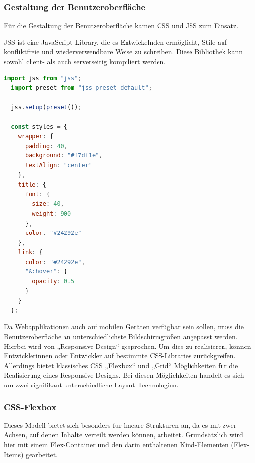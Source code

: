 \subsubsection{Gestaltung der Benutzeroberfläche}

Für die Gestaltung der Benutzeroberfläche kamen CSS und JSS zum Einsatz.

JSS ist eine JavaScript-Library, die es Entwickelnden ermöglicht, Stile auf konfliktfreie und wiederverwendbare Weise zu schreiben. Diese Bibliothek kann sowohl client- als auch serverseitig kompiliert werden. 
\cite{jss}

\begin{lstlisting}[language=JavaScript, caption=Beispiel Source-Code für die Verwendung von JSS, label=lst:impl:bspJSS]
  import jss from "jss";
  import preset from "jss-preset-default";
  
  jss.setup(preset());
  
  const styles = {
    wrapper: {
      padding: 40,
      background: "#f7df1e",
      textAlign: "center"
    },
    title: {
      font: {
        size: 40,
        weight: 900
      },
      color: "#24292e"
    },
    link: {
      color: "#24292e",
      "&:hover": {
        opacity: 0.5
      }
    }
  };
\end{lstlisting} \cite{jssExample}

Da Webapplikationen auch auf mobilen Geräten verfügbar sein sollen, muss die Benutzeroberfläche an unterschiedlichste Bildschirmgrößen angepasst werden. Hierbei wird von „Responsive Design“ gesprochen. Um dies zu realisieren, können Entwicklerinnen oder Entwickler auf bestimmte CSS-Libraries zurückgreifen. Allerdings bietet klassisches CSS „Flexbox“ und „Grid“ Möglichkeiten für die Realisierung eines Responsive Designs. Bei diesen Möglichkeiten handelt es sich um zwei signifikant unterschiedliche Layout-Technologien.
 \newpage

\subsubsection{CSS-Flexbox}

Dieses Modell bietet sich besonders für lineare Strukturen an, da es mit zwei Achsen, auf denen Inhalte verteilt werden können, arbeitet. Grundsätzlich wird hier mit einem Flex-Container und den darin enthaltenen Kind-Elementen (Flex-Items) gearbeitet. 
\cite{flexbox}

